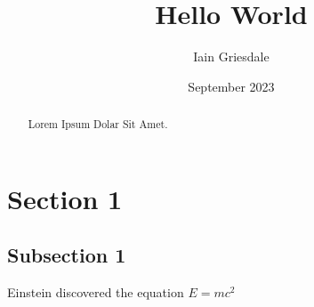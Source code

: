 \documentclass[titlepage]{article}
\title{Hello World}
\author{Iain Griesdale}
\date{September 2023}
\begin{document}
\maketitle

\begin{abstract}
    Lorem Ipsum Dolar Sit Amet.
\end{abstract}

\section{Section 1}

\subsection{Subsection 1}

Einstein discovered the equation $E=mc^2$
\end{document}
